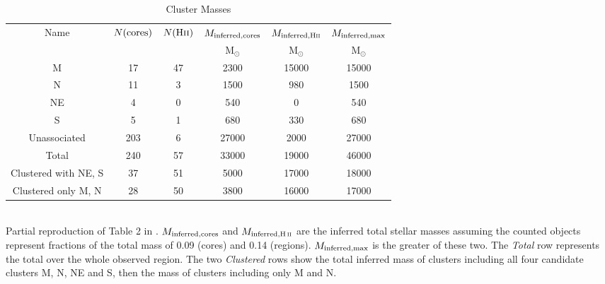 \begin{table*}[htp]
\centering
\begin{minipage}{122.5mm}
\caption{Cluster Masses}
\begin{tabular}{cccccc}
\label{tab:clustermassestimates}
Name & $N({\rm cores})$ & $N({\rm H\textsc{ii}})$ & $M_{\rm inferred, cores}$ & $M_{\rm inferred, H\textsc{ii}}$ & $M_{\rm inferred,max}$ \\
 &  &  & $\mathrm{M_{\odot}}$ & $\mathrm{M_{\odot}}$ & $\mathrm{M_{\odot}}$ \\
\hline
M & 17 & 47 & 2300 & 15000 & 15000 \\
N & 11 & 3 & 1500 & 980 & 1500 \\
NE & 4 & 0 & 540 & 0 & 540 \\
S & 5 & 1 & 680 & 330 & 680 \\
Unassociated & 203 & 6 & 27000 & 2000 & 27000 \\
Total & 240 & 57 & 33000 & 19000 & 46000 \\
Clustered with NE, S & 37 & 51 & 5000 & 17000 & 18000 \\
Clustered only M, N & 28 & 50 & 3800 & 16000 & 17000 \\
\hline
\end{tabular}
\\
Partial reproduction of Table 2 in \citet{Ginsburg2018a}. $M_{\rm inferred,cores}$ and $M_{\rm inferred,\hii}$ are the inferred total stellar masses assuming the counted objects represent fractions of the total mass of 0.09 (cores) and 0.14 (\hii regions).  $M_{\rm inferred,max}$ is the greater of these two.  The \emph{Total} row represents the total over the whole observed region.  The two \emph{Clustered} rows show the total inferred mass of clusters including all four candidate clusters M, N, NE and S, then the mass of clusters including only M and N.
\end{minipage}
\end{table*}

